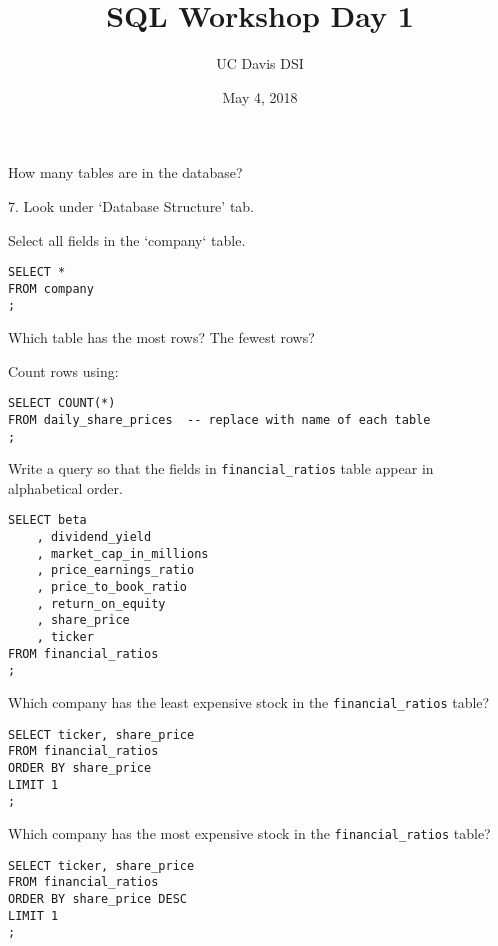 \documentclass[10pt]{exam}
\begin{document}
 
\title{SQL Workshop Day 1}
\author{UC Davis DSI}
\date{May 4, 2018}

\maketitle

\begin{questions}

\question How many tables are in the database?

\begin{solution}
    7. Look under `Database Structure' tab.
\end{solution}


\question Select all fields in the `company` table.

\begin{solution}
\begin{lstlisting}
SELECT *
FROM company
;
\end{lstlisting}
\end{solution}


\question Which table has the most rows? The fewest rows?

\begin{solution}

    Count rows using:

\begin{lstlisting}
SELECT COUNT(*)
FROM daily_share_prices  -- replace with name of each table
;
\end{lstlisting}
\end{solution}


\question Write a query so that the fields in \texttt{financial\_ratios} table
appear in alphabetical order.

\begin{solution}
\begin{lstlisting}
SELECT beta
    , dividend_yield
    , market_cap_in_millions
    , price_earnings_ratio
    , price_to_book_ratio
    , return_on_equity
    , share_price
    , ticker
FROM financial_ratios
;
\end{lstlisting}
\end{solution}


    \question Which company has the least expensive stock in the
    \texttt{financial\_ratios} table?

\begin{solution}
\begin{lstlisting}
SELECT ticker, share_price
FROM financial_ratios
ORDER BY share_price
LIMIT 1
;
\end{lstlisting}
\end{solution}

    \question Which company has the most expensive stock in the
    \texttt{financial\_ratios} table?

\begin{solution}
\begin{lstlisting}
SELECT ticker, share_price
FROM financial_ratios
ORDER BY share_price DESC
LIMIT 1
;
\end{lstlisting}
\end{solution}


\end{questions}
\end{document}
